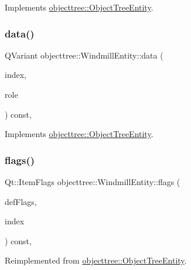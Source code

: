 Implements \mbox{\hyperlink{classobjecttree_1_1_object_tree_entity_a70fd25eccf88b305e9db15fbe3daeae8}{objecttree\+::\+Object\+Tree\+Entity}}.

\mbox{\label{classobjecttree_1_1_windmill_entity_a4b91c77b810fc3456d78f18daaad8362}} 
\subsubsection{\texorpdfstring{data()}{data()}}
{\footnotesize\ttfamily Q\+Variant objecttree\+::\+Windmill\+Entity\+::data (\begin{DoxyParamCaption}\item[{const Q\+Model\+Index \&}]{index,  }\item[{int}]{role }\end{DoxyParamCaption}) const\hspace{0.3cm}{\ttfamily [override]}, {\ttfamily [virtual]}}



Implements \mbox{\hyperlink{classobjecttree_1_1_object_tree_entity_a2413c6573de18b451d97eb3800f10f35}{objecttree\+::\+Object\+Tree\+Entity}}.

\mbox{\label{classobjecttree_1_1_windmill_entity_a867c267caf8df2bbf9fd40903a5250d0}} 
\subsubsection{\texorpdfstring{flags()}{flags()}}
{\footnotesize\ttfamily Qt\+::\+Item\+Flags objecttree\+::\+Windmill\+Entity\+::flags (\begin{DoxyParamCaption}\item[{Qt\+::\+Item\+Flags}]{def\+Flags,  }\item[{const Q\+Model\+Index \&}]{index }\end{DoxyParamCaption}) const\hspace{0.3cm}{\ttfamily [override]}, {\ttfamily [virtual]}}



Reimplemented from \mbox{\hyperlink{classobjecttree_1_1_object_tree_entity_a71042bfb5a8328bcbde9d283c0b1b28c}{objecttree\+::\+Object\+Tree\+Entity}}.


